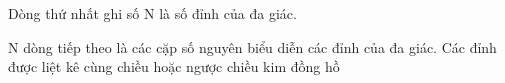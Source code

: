 Dòng thứ nhất ghi số N là số đỉnh của đa giác.  

   N dòng tiếp theo là các cặp số nguyên biểu diễn các đỉnh của đa giác. Các đỉnh được liệt kê cùng chiều hoặc ngược chiều kim đồng hồ
